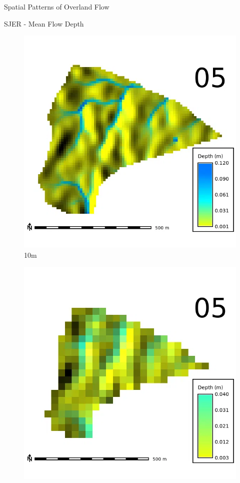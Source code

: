 \documentclass[
  ignorenonframetext,
]{beamer}
\begin{document}
\begin{frame}{Spatial Patterns of Overland Flow}
\begin{block}{SJER - Mean Flow Depth}
\begin{figure}[H]
{\centering \includegraphics{../output/SJER/sensitivity_1/SJER_depth_10_025_s_average.webp}

}

\caption{10m}

\end{figure}%

\begin{figure}[H]

{\centering \includegraphics{../output/SJER/sensitivity_1/SJER_depth_30_025_s_average.webp}

}
\end{figure}
\end{block}
\end{frame}
\end{document}
